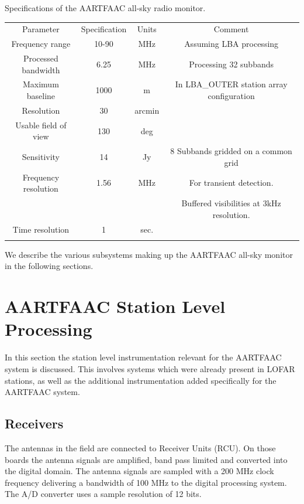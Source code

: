 \documentclass{ws-jai}
\begin{document}
\begin{wstable}[h]
\caption{Specifications of the AARTFAAC all-sky radio monitor.}
\begin{tabular}{@{}cccc@{}} \toprule
Parameter & Specification & Units & Comment\\ \colrule
Frequency range & 10-90 & MHz & Assuming LBA processing  \\
Processed bandwidth & 6.25 & MHz & Processing 32 subbands \\
Maximum baseline & 1000 & m & In LBA\_OUTER station array configuration\\
Resolution & 30 & arcmin & \\
Usable field of view & 130 & deg &  \\
Sensitivity & 14 & Jy & 8 Subbands gridded on a common grid \\
Frequency resolution & 1.56 & MHz & For transient detection. \\
 & & & Buffered visibilities at 3kHz resolution.\\
Time resolution & 1 & sec.\\ \colrule

\end{tabular}
\label{tab:afaac_specs}
\end{wstable}


We describe the various subsystems making up the AARTFAAC all-sky monitor in the
following sections.

\section {\label{sec:station_hardware} AARTFAAC Station Level Processing}
In  this section  the station  level instrumentation  relevant for  the AARTFAAC
system is discussed.  This involves systems which were already  present in LOFAR
stations, as well  as the additional instrumentation added  specifically for the
AARTFAAC system.
\subsection {Receivers}  The  antennas  in the  field  are connected  to
Receiver Units  (RCU). On those boards  the antenna signals are  amplified, band
pass limited  and converted into  the digital  domain.  The antenna  signals are
sampled with a 200 MHz clock frequency  delivering a bandwidth of 100 MHz to the
digital processing  system. The  A/D converter  uses a  sample resolution  of 12
bits.
\end{document}
